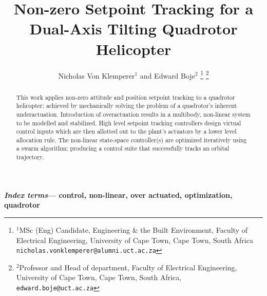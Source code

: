 \documentclass[a4paper, 10pt, conference]{ieeeconf}
\title{\LARGE \bf
Non-zero Setpoint Tracking for a Dual-Axis Tilting Quadrotor Helicopter
}
\author{Nicholas Von Klemperer$^{1}$ and Edward Boje$^{2}$%
\thanks{$^{1}$MSc (Eng) Candidate, Engineering \& the Built Environment, Faculty of Electrical Engineering, University of Cape Town, Cape Town, South Africa
{\tt\small nicholas.vonklemperer@alumni.uct.ac.za}}
\thanks{$^{2}$Professor and Head of department, Faculty of Electrical Engineering, University of Cape Town, Cape Town, South Africa,
        {\tt\small edward.boje@uct.ac.za}}%
}
\begin{document}
\maketitle
\thispagestyle{empty}
\pagestyle{empty}
\begin{abstract}
This work applies non-zero attitude and position setpoint tracking to a quadrotor helicopter; achieved by mechanically solving the problem of a quadrotor's inherent underactuation. Introduction of overactuation results in a multibody, non-linear system to be modelled and stabilized. High level setpoint tracking controllers design virtual control inputs which are then allotted out to the plant's actuators by a lower level allocation rule. The non-linear state-space controller(s) are optimized iteratively using a swarm algorithm; producing a control suite that successfully tracks an orbital trajectory.
\end{abstract}
\textbf{\emph{Index terms}--- control, non-linear, over actuated, optimization, quadrotor}
\end{document}
